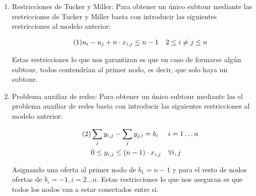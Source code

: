 \documentclass[a4paper,11pt]{article}
\newcommand\numberthis{							%
	\addtocounter{equation}{1}\tag{\theequation}
}
\begin{document}
\begin{enumerate}
\item Restricciones de Tucker y Miller: Para obtener un único subtour mediante las restricciones de Tucker y Miller basta con introducir las siguientes restricciones al modelo anterior:

\begin{align*}\numberthis
   	& u_{i} - u_{j} + n \cdot x_{i,j} \leq n - 1	&& 2 \leq i \neq j \leq n	\\
\end{align*}

Estas restricciones lo que nos garantizan es que en caso de formarse algún subtour, todos contendrían al primer nodo, es decir, que solo haya un subtour.

\item Problema auxiliar de redes: Para obtener un único subtour mediante las el problema auxiliar de redes basta con introducir las siguientes restricciones al modelo anterior:

\begin{align*}\numberthis
   	& \sum_{j}{y_{i,j}} - \sum_{j}{y_{j,i}} = b_{i}	&& i = 1 \ldots n	\\
    & 0 \leq y_{i,j} \leq (n-1) \cdot x_{i,j}			&& \forall i,j		\\
\end{align*}

Asignando una oferta al primer nodo de ${b_{1} = n-1}$ y para el resto de nodos ofertas de ${b_{i} = -1, i=2 \ldots n}$. Estas restricciones lo que nos aseguran es que todos los nodos van a estar conectados entre si.
\end{enumerate}

\end{document}
